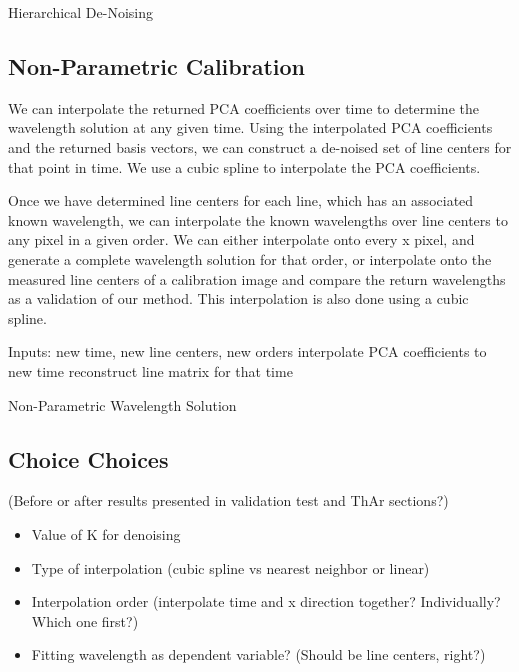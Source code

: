 \documentclass[12pt, letterpaper]{article}
\begin{document}
\begin{algorithm}
\SetAlgoLined
{}
\caption{Hierarchical De-Noising}
\end{algorithm}

\subsection{Non-Parametric Calibration}
We can interpolate the returned PCA coefficients over time to determine the wavelength solution at any given time.  Using the interpolated PCA coefficients and the returned basis vectors, we can construct a de-noised set of line centers for that point in time.  We use a cubic spline to interpolate the PCA coefficients.

Once we have determined line centers for each line, which has an associated known wavelength, we can interpolate the known wavelengths over line centers to any pixel in a given order.  We can either interpolate onto every x pixel, and generate a complete wavelength solution for that order, or interpolate onto the measured line centers of a calibration image and compare the return wavelengths as a validation of our method.  This interpolation is also done using a cubic spline.

\begin{algorithm}
\SetAlgoLined
Inputs: new time, new line centers, new orders\; %
interpolate PCA coefficients to new time\;
reconstruct line matrix for that time\;
\caption{Non-Parametric Wavelength Solution}
\end{algorithm}

\subsection{Choice Choices} \label{sec:choices}
(Before or after results presented in validation test and ThAr sections?)
\begin{itemize}
	\item Value of K for denoising
	\item Type of interpolation (cubic spline vs nearest neighbor or linear)
	\item Interpolation order (interpolate time and x direction together?  Individually?  Which one first?)
	\item Fitting wavelength as dependent variable?  (Should be line centers, right?)
\end{itemize}
\end{document}
